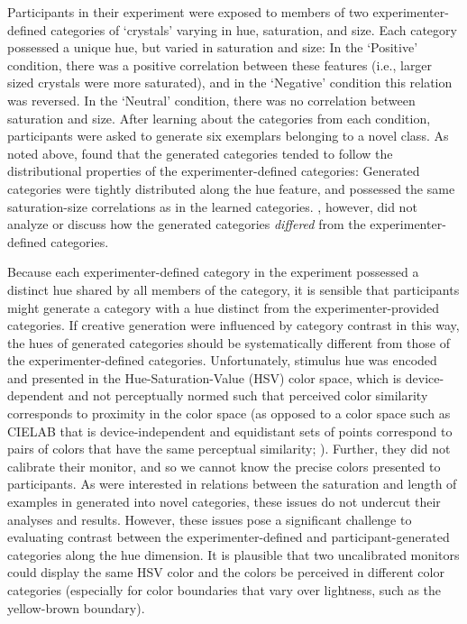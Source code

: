\documentclass[12pt]{article}
\begin{document}
\begin{flushleft}
Participants in their experiment were exposed to members of two
experimenter-defined categories of `crystals' varying in hue, saturation, and
size. Each category possessed a unique hue, but varied in saturation and size:
In the `Positive' condition, there was a positive correlation between these
features (i.e., larger sized crystals were more saturated), and in the
`Negative' condition this relation was reversed. In the `Neutral' condition,
there was no correlation between saturation and size. After learning about the
categories from each condition, participants were asked to generate six
exemplars belonging to a novel class. As noted above,
\cite{jern2013probabilistic} found that the generated categories tended to
follow the distributional properties of the experimenter-defined categories:
Generated categories were tightly distributed along the hue feature, and
possessed the same saturation-size correlations as in the learned categories.
\cite{jern2013probabilistic}, however, did not analyze or discuss how the
generated categories {\em differed} from the experimenter-defined categories.

Because each experimenter-defined category in the \cite{jern2013probabilistic}
experiment possessed a distinct hue shared by all members of the category, it is
sensible that participants might generate a category with a hue distinct from
the experimenter-provided categories. If creative generation were influenced by
category contrast in this way, the hues of generated categories should be
systematically different from those of the experimenter-defined categories.
Unfortunately, stimulus hue was encoded and presented in the
Hue-Saturation-Value (HSV) color space, which is device-dependent and not
perceptually normed such that perceived color similarity corresponds to
proximity in the color space (as opposed to a color space such as CIELAB that is
device-independent and equidistant sets of points correspond to pairs of colors
that have the same perceptual similarity; \citealp{wyszecki1967}). Further, they
did not calibrate their monitor, and so we cannot know the precise colors
presented to participants. As \cite{jern2013probabilistic} were interested in
relations between the saturation and length of examples in generated into novel
categories, these issues do not undercut their analyses and results. However,
these issues pose a significant challenge to evaluating contrast between the
experimenter-defined and participant-generated categories along the hue
dimension. It is plausible that two uncalibrated monitors could display the same
HSV color and the colors be perceived in different color categories (especially
for color boundaries that vary over lightness, such as the yellow-brown
boundary).


\end{flushleft}
\end{document}
